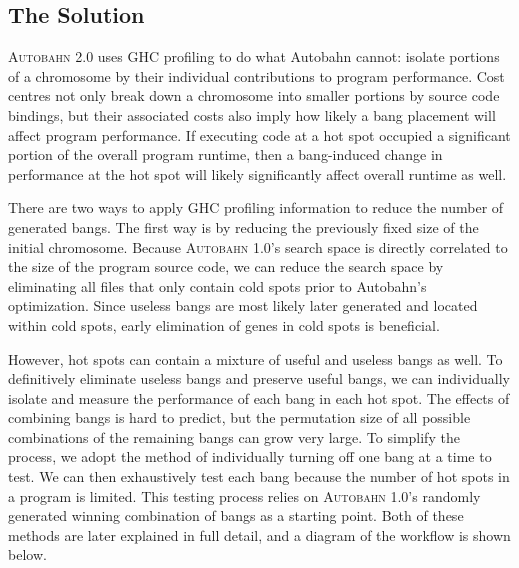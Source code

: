 \documentclass[format=sigplan, review=true]{acmart}
\newcommand{\hotspot}[0]{hot spot}
\newcommand{\hotspots}[0]{hot spots}
\newcommand{\coldspots}[0]{cold spots}
\newcommand{\useful}[0]{useful}
\newcommand{\useless}[0]{useless}
\newcommand{\Ao}[0]{\textsc{Autobahn 1.0}}
\newcommand{\At}[0]{\textsc{Autobahn 2.0}}
\begin{document}
\subsection{The Solution}

\At{} uses GHC profiling to do what Autobahn cannot: isolate portions of a chromosome by their individual contributions to program performance. Cost centres not only break down a chromosome into smaller portions by source code bindings, but their associated costs also imply how likely a bang placement will affect program performance. If executing code at a \hotspot{} occupied a significant portion of the overall program runtime, then a bang-induced change in performance at the \hotspot{} will likely significantly affect overall runtime as well. 

There are two ways to apply GHC profiling information to reduce the number of generated bangs. The first way is by reducing the previously fixed size of the initial chromosome. Because \Ao{}'s search space is directly correlated to the size of the program source code, we can reduce the search space by eliminating all files that only contain \coldspots{} prior to Autobahn's optimization. Since \useless{} bangs are most likely later generated and located within \coldspots{}, early elimination of genes in \coldspots{} is beneficial. 

However, \hotspots{} can contain a mixture of \useful{} and \useless{} bangs as well. To definitively eliminate \useless{} bangs and preserve \useful{} bangs, we can individually isolate and measure the performance of each bang in each \hotspot{}. The effects of combining bangs is hard to predict, but the permutation size of all possible combinations of the remaining bangs can grow very large. To simplify the process, we adopt the method of individually turning off one bang at a time to test. We can then exhaustively test each bang because the number of \hotspots{} in a program is limited. This testing process relies on \Ao{}'s randomly generated winning combination of bangs as a starting point. Both of these methods are later explained in full detail, and a diagram of the workflow is shown below.
\newline
{}
\end{document}
